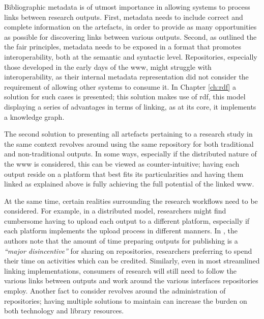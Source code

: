 Bibliographic metadata is of utmost importance in allowing systems to process links between research outputs. First, metadata needs to include correct and complete information on the artefacts, in order to provide as many opportunities as possible for discovering links between various outputs. Second, as outlined the the \gls{fair} principles, metadata needs to be exposed in a format that promotes interoperability, both at the semantic and syntactic level. Repositories, especially those developed in the early days of the \gls{www}, might struggle with interoperability, as their internal metadata representation did not consider the requirement of allowing other systems to consume it. In Chapter \ref{ch:rdf} a solution for such cases is presented; this solution makes use of \gls{rdf}, this model displaying a series of advantages in terms of linking, as at its core, it implements a knowledge graph.

The second solution to presenting all artefacts pertaining to a research study in the same context revolves around using the same repository for both traditional and non-traditional outputs. In some ways, especially if the distributed nature of the \gls{www} is considered, this can be viewed as counter-intuitive; having each output reside on a platform that best fits its particularities and having them linked as explained above is fully achieving the full potential of the linked \gls{www}.

At the same time, certain realities surrounding the research workflows need to be considered. For example, in a distributed model, researchers might find cumbersome having to upload each output to a different platform, especially if each platform implements the upload process in different manners. In \cite{austin}, the authors note that the amount of time preparing outputs for publishing is a \emph{``major disincentive''} for sharing on repositories, researchers preferring to spend their time on activities which can be credited. Similarly, even in most streamlined linking implementations, consumers of research will still need to follow the various links between outputs and work around the various interfaces repositories employ. Another fact to consider revolves around the administration of repositories; having multiple solutions to maintain can increase the burden on both technology and library resources.

